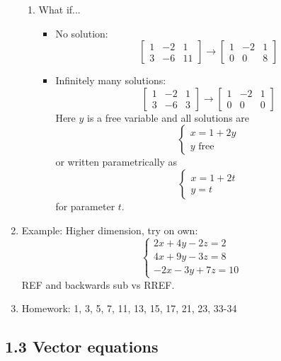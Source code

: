 \documentclass{article}
\begin{document}
\begin{enumerate}
\begin{enumerate}
\item What if...
\begin{itemize}

\item No solution:
\[
\left[
\begin{array} {cc|c}
1 & -2 & 1 \\
3 & -6 & 11
\end{array}
\right]
\rightarrow
\left[
\begin{array} {cc|c}
1 & -2 & 1 \\
0 & 0 & 8
\end{array}
\right]
\]

\item Infinitely many solutions:
\[
\left[
\begin{array} {cc|c}
1 & -2 & 1 \\
3 & -6 & 3
\end{array}
\right]
\rightarrow
\left[
\begin{array} {cc|c}
1 & -2 & 1 \\
0 & 0 & 0
\end{array}
\right]
\]
Here $y$ is a free variable and all solutions are
\[
\begin{cases}
x = 1+2y \\
y \text{ free}
\end{cases}
\]
or written parametrically as
\[
\begin{cases}
x = 1+2t \\
y = t
\end{cases}
\]
for parameter $t$.
\end{itemize}

\end{enumerate}


\item Example: Higher dimension, try on own:
\[
\begin{cases}
2x+4y-2z = 2 \\
4x+9y-3z = 8 \\
-2x-3y+7z = 10
\end{cases}
\]
REF and backwards sub vs RREF.

\item Homework: 1, 3, 5, 7, 11, 13, 15, 17, 21, 23, 33-34 

\end{enumerate}

\subsection{1.3 Vector equations}
\end{document}
